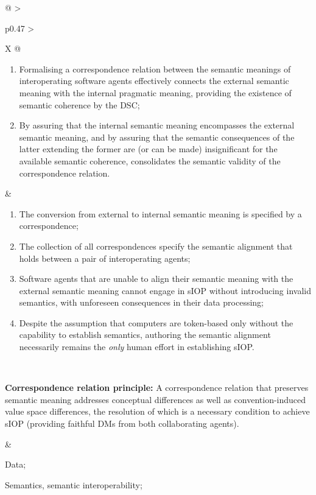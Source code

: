 \begin{xltabular}[l]{\linewidth}{@{} >{\small\raggedright\arraybackslash}p{0.47\linewidth} >{\small\raggedright\arraybackslash}X @{}}
\begin{enumerate}[left=6pt, nosep]
  \item Formalising a correspondence relation between the semantic meanings of interoperating software agents effectively connects the external semantic meaning with the internal pragmatic meaning, providing the existence of semantic coherence by the DSC;
  \item By assuring that the internal semantic meaning encompasses the external semantic meaning, and by assuring that the semantic consequences of the latter extending the former are (or can be made) insignificant for the available semantic coherence, consolidates the semantic validity of the correspondence relation.
\end{enumerate}
&
\begin{enumerate}[left=10pt, nosep]
  \item The conversion from external to internal semantic meaning is specified by a correspondence;
  \item The collection of all correspondences specify the semantic alignment that holds between a pair of interoperating agents;
  \item Software agents that are unable to align their semantic meaning with the external semantic meaning cannot engage in sIOP without introducing invalid semantics, with unforeseen consequences in their data processing;
  \item Despite the assumption that computers are token-based only without the capability to establish semantics, authoring the semantic alignment necessarily remains the \emph{only} human effort in establishing sIOP.
\end{enumerate} \\
%
%
%
\begin{mmdp}\label{dp:alignment-language}{\bfseries Correspondence relation principle:}
\quad A correspondence relation that preserves semantic meaning addresses conceptual differences as well as convention-induced value space differences, the resolution of which is a necessary condition to achieve sIOP (providing faithful DMs from both collaborating agents). \end{mmdp}
&
\begin{description}[labelwidth=3.7cm,leftmargin=3.7cm+1ex,nosep,topsep=2ex,labelsep=1ex,font=\bfseries]
  \item[Type of information:] Data;
  \item[Quality attributes:] Semantics, semantic interoperability;
\end{description}\\

\end{xltabular}
